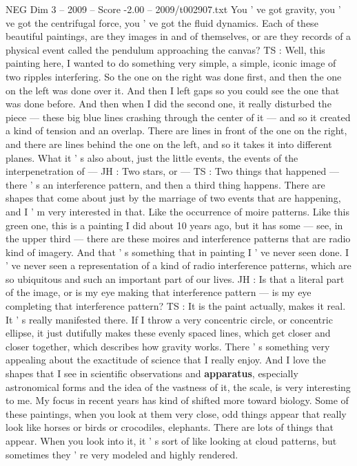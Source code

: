 \begin{textsample}{NEG Dim 3 – 2009 – Score -2.00 – 2009/t002907.txt}
You ' ve got gravity, you ' ve got the centrifugal force, you ' ve got the fluid dynamics.
Each of these beautiful paintings, are they images in and of themselves, or are they records of a physical event called the pendulum approaching the canvas?
TS : Well, this painting here, I wanted to do something very simple, a simple, iconic image of two ripples interfering.
So the one on the right was done first, and then the one on the left was done over it.
And then I left gaps so you could see the one that was done before.
And then when I did the second one, it really disturbed the piece — these big blue lines crashing through the center of it — and so it created a kind of tension and an overlap.
There are lines in front of the one on the right, and there are lines behind the one on the left, and so it takes it into different planes.
What it ' s also about, just the little events, the events of the interpenetration of — JH : Two stars, or — TS : Two things that happened — there ' s an interference pattern, and then a third thing happens.
There are shapes that come about just by the marriage of two events that are happening, and I ' m very interested in that.
Like the occurrence of moire patterns.
Like this green one, this is a painting I did about 10 years ago, but it has some — see, in the upper third — there are these moires and interference patterns that are radio kind of imagery.
And that ' s something that in painting I ' ve never seen done.
I ' ve never seen a representation of a kind of radio interference patterns, which are so ubiquitous and such an important part of our lives.
JH : Is that a literal part of the image, or is my eye making that interference pattern — is my eye completing that interference pattern?
TS : It is the paint actually, makes it real.
It ' s really manifested there.
If I throw a very concentric circle, or concentric ellipse, it just dutifully makes these evenly spaced lines, which get closer and closer together, which describes how gravity works.
There ' s something very appealing about the exactitude of science that I really enjoy.
And I love the shapes that I see in scientific observations and \textbf{apparatus}, especially astronomical forms and the idea of the vastness of it, the scale, is very interesting to me.
My focus in recent years has kind of shifted more toward biology.
Some of these paintings, when you look at them very close, odd things appear that really look like horses or birds or crocodiles, elephants.
There are lots of things that appear.
When you look into it, it ' s sort of like looking at cloud patterns, but sometimes they ' re very modeled and highly rendered.

\end{textsample}
